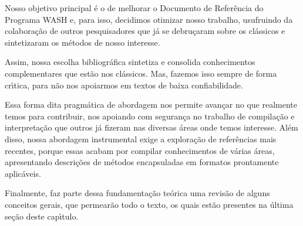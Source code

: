 \documentclass[
12pt,		%
openright,	%
twoside,  %
a4paper,			%
chapter=TITLE,		%
english,			%
french,				%
spanish,			%
brazil				%
]{USPSC-classe/USPSC}
\begin{document}
Nosso objetivo principal \'e o de melhorar o Documento de Refer\^encia do Programa WASH e, para isso, decidimos otimizar nosso trabalho, usufruindo da colabora\c{c}\~ao de outros pesquisadores que j\'a se debru\c{c}aram sobre os cl\'assicos e  sintetizaram os m\'etodos de nosso interesse.

















Assim, nossa escolha bibliogr\'afica sintetiza e consolida conhecimentos complementares que est\~ao nos cl\'assicos. Mas, fazemos isso sempre de forma cr\'{\i}tica, para n\~ao nos apoiarmos em textos de baixa confiabilidade.

















Essa forma dita \textquotedbl  pragm\'atica \textquotedbl  de abordagem nos permite avan\c{c}ar no que realmente temos para contribuir, nos apoiando com seguran\c{c}a no trabalho de compila\c{c}\~ao e interpreta\c{c}\~ao que outros j\'a fizeram nas diversas \'areas onde temos interesse. Al\'em disso, nossa abordagem instrumental exige a explora\c{c}\~ao de refer\^encias mais recentes, porque essas acabam por compilar conhecimentos de v\'arias \'areas, apresentando descri\c{c}\~oes de m\'etodos encapsuladas em formatos prontamente aplic\'aveis.

















Finalmente, faz parte dessa fundamenta\c{c}\~ao te\'orica uma revis\~ao de alguns conceitos gerais, que permear\~ao todo o texto, os quais est\~ao presentes na \'ultima se\c{c}\~ao deste cap\'{\i}tulo.
\end{document}
